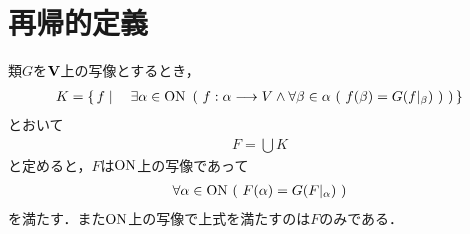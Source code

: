 \section{再帰的定義}
\label{sec:recursive_definition}
	類$G$を$\mathbf{V}$上の写像とするとき，
	\begin{align}
		K = \left\{\, f \mid \quad \exists \alpha \in \mathrm{ON}\ \left(\ f:\alpha \longrightarrow V \wedge \forall \beta \in \alpha\ (\ f(\beta) = G(f|_\beta)\ )\ \right)\, \right\}
	\end{align}
	とおいて
	\begin{align}
		F = \bigcup K
	\end{align}
	と定めると，$F$は$\mathrm{ON}$上の写像であって
	\begin{align}
		\forall \alpha \in \mathrm{ON}\ (\ F(\alpha) = G(F|_\alpha)\ )
	\end{align}
	を満たす．また$\mathrm{ON}$上の写像で上式を満たすのは$F$のみである．
	
